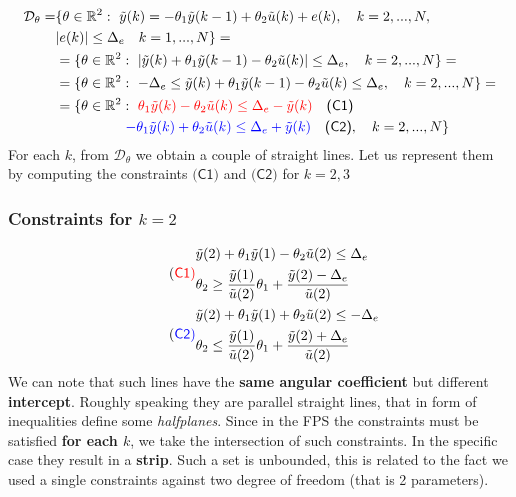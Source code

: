 \begin{equation}
    \begin{aligned}
        \mathcal{D}_\theta = &\{
            \theta\in\mathbb{R}^2: \ 
            \tilde{y}(k)=-\theta_1\tilde{y}(k-1)+\theta_2{\tilde{u}(k)} + e(k), \quad k=2, ..., N, \\
            & \vert e(k) \vert \le \Delta_e   \quad k=1,..., N
        \}=\\
        &=\{\theta\in\mathbb{R}^2: \
            \vert
            \tilde{y}(k)+\theta_1\tilde{y}(k-1)-\theta_2{\tilde{u}(k)}
            \vert  \le \Delta_e, \quad k=2,..., N
        \}=\\
        &=\{ \theta\in\mathbb{R}^2: \ -\Delta_e \le 
            \tilde{y}(k)+\theta_1\tilde{y}(k-1)-\theta_2{\tilde{u}(k)}
            \le \Delta_e, \quad k=2,...,N
        \}=\\
        &=\{\theta\in\mathbb{R}^2: \
            {\color{red}\theta_1\tilde{y}(k)-\theta_2\tilde{u}(k) \le \Delta_e-\tilde{y}(k)} \quad \textsf{(C1)} \\
            &\qquad \qquad \quad{\color{blue}-\theta_1\tilde{y}(k)+\theta_2\tilde{u}(k) \le \Delta_e+\tilde{y}(k)} \quad \textsf{(C2)}, \quad k=2, ..., N
        \}
    \end{aligned}
\end{equation}
\noindent
For each $k$, from $\mathcal{D}_\theta$ we obtain a couple of straight lines. Let us represent them by computing the constraints $\textsf{(C1)}$ and $\textsf{(C2)}$ for $k=2,3$

\subsubsection{Constraints for \color{red} $k=2$}
\begin{align}
    \tag{\color{red}\textsf{C1}}
    &\begin{aligned}\label{eq:c1_1}
        &\tilde{y}(2)+\theta_1{\tilde{y}(1)}-\theta_2\tilde{u}(2) \le \Delta_e \\
        &\theta_2 \ge \frac{\tilde{y}(1)}{\tilde{u}(2)}\theta_1 + \frac{\tilde{y}(2)-\Delta_e}{\tilde{u}(2)}
    \end{aligned}\\
    \tag{\color{blue}\textsf{C2}}
    &\begin{aligned}\label{eq:c1_1}
        &\tilde{y}(2)+\theta_1{\tilde{y}(1)}+\theta_2\tilde{u}(2) \le -\Delta_e \\
        &\theta_2 \le \frac{\tilde{y}(1)}{\tilde{u}(2)}\theta_1 + \frac{\tilde{y}(2)+\Delta_e}{\tilde{u}(2)}
    \end{aligned}
\end{align}
We can note that such lines have the \textbf{same angular coefficient} but different \textbf{intercept}. Roughly speaking they are parallel straight lines, that in form of inequalities define some \textit{halfplanes}. Since in the FPS the constraints must be satisfied \textbf{for each $k$}, we take the intersection of such constraints. In the specific case they result in a \textbf{strip}. Such a set is unbounded, this is related to the fact we used a single constraints against two degree of freedom (that is 2 parameters). 


